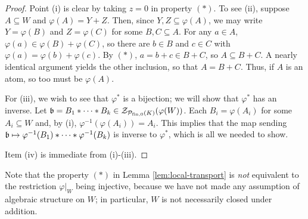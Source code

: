 \begin{proof}
	Point (i) is clear by taking $z = 0$ in property $(*)$.
	To see (ii), suppose $A\subseteq W$ and $\varphi(A) = Y+Z$.
	Then, since $Y,Z\subseteq \varphi(A)$, we may write $Y = \varphi(B)$ and $Z = \varphi(C)$ for some $B,C\subseteq A$.
	For any $a\in A$, $\varphi(a) \in \varphi(B) + \varphi(C)$, so there are $b\in B$ and $c\in C$ with $\varphi(a) = \varphi(b) + \varphi(c)$.
	By $(*)$, $a = b + c \in B+C$, so $A \subseteq B + C$.
	A nearly identical argument yields the other inclusion, so that $A = B+C$.
	Thus, if $A$ is an atom, so too must be $\varphi(A)$. 
	
	For (iii), we wish to see that $\varphi^*$ is a bijection; we will show that $\varphi^*$ has an inverse.
	Let $\mathfrak{b} = B_1 * \cdots * B_k\in \mathcal{Z}_{\mathcal{P}_{\textrm{fin}, 0}(K)}(\varphi(W))$.
	Each $B_i = \varphi(A_i)$ for some $A_i\subseteq W$ and, by (i), $\varphi^{-1}(\varphi(A_i)) = A_i$.
	This implies that the map sending $\mathfrak{b} \mapsto \varphi^{-1}(B_1) * \cdots * \varphi^{-1}(B_k)$ is inverse to $\varphi^*$, which is all we needed to show.
	
	Item (iv) is immediate from (i)-(iii).
\end{proof}

\begin{rk}
	Note that the property $(*)$ in Lemma \ref{lem:local-transport} is \textit{not} equivalent to the restriction $\varphi|_W$ being injective, because we have not made any assumption of algebraic structure on $W$; in particular, $W$ is not necessarily closed under addition. 
\end{rk}

